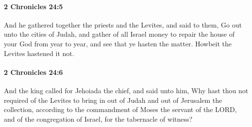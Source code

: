 		\paragraph{2 Chronicles 24:5} %
			\label{2CHRONICLES-24-5}

			And he gathered together the priests and the Levites, and said to them, Go out unto the cities of Judah, and gather of all Israel money to repair the house of your God from year to year, and see that ye hasten the matter. Howbeit the Levites hastened it not.


		\paragraph{2 Chronicles 24:6} %
			\label{2CHRONICLES-24-6}

			And the king called for Jehoiada the chief, and said unto him, Why hast thou not required of the Levites to bring in out of Judah and out of Jerusalem the collection, according to the commandment of Moses the servant of the LORD, and of the congregation of Israel, for the tabernacle of witness?

